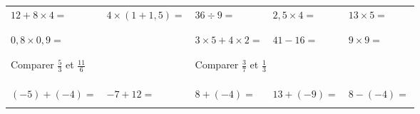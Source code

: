 \documentclass[14]{article}
\begin{document}
    \begin{tabular}{p{3cm}|p{3cm}|p{3cm}|p{3cm}|p{3cm}}
         $12+8\times4=$ & $4\times(1+1,5)=$ & $36\div9 = $ & $2,5\times4=$ & $13\times5=$\\ 
         
         & & & &\\ \hline & & & &\\
         
         $0,8\times 0,9=$ & $ $ & $3\times5+4\times2=$ &  $41-16=$ & $9\times9=$\\
         
         & & & &\\ \hline \multicolumn{2}{c|}{} & \multicolumn{2}{c}{}\\
         
         \multicolumn{2}{l|}{Comparer $\frac{5}{3}$ et $\frac{11}{6}$} & 
         \multicolumn{3}{l}{Comparer $\frac{3}{7}$ et $\frac{1}{3}$}\\
         
        \multicolumn{2}{c|}{} & \multicolumn{3}{c}{} \\[2ex]

        \multicolumn{2}{c|}{} & \multicolumn{2}{c}{}\\ \hline & & & &\\ 

        $(-5)+(-4)=$ & $-7+12=$ & $8+(-4)= $ & $13+(-9)=$ & $8-(-4)=$ \\
        
        & & & &\\ 
    \end{tabular}
\end{document}
